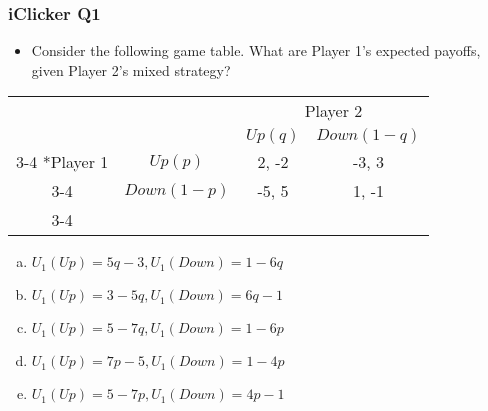 \begin{frame}
\frametitle{iClicker Q1}
\begin{itemize}
\item Consider the following game table. What are Player 1's expected payoffs, given Player 2's mixed strategy?
\end{itemize}
\begin{table}[h]
\centering
\begin{tabular}{cc|c|c|}
	& \multicolumn{1}{c}{} & \multicolumn{2}{c}{Player 2}\\
	& \multicolumn{1}{c}{} & \multicolumn{1}{c}{$Up (q)$}  & \multicolumn{1}{c}{$Down (1 - q)$} \\\cline{3-4}
	\multirow{2}*{Player 1}  & $Up (p)$ & 2, -2 & -3, 3 \\\cline{3-4}
	& $Down (1 - p)$ & -5, 5 & 1, -1 \\\cline{3-4}
\end{tabular}
\end{table}
  \begin{enumerate}[(a)]
\item $U_1(Up) = 5q - 3, U_1(Down) = 1 - 6q$
\item $U_1(Up) = 3 - 5q, U_1(Down) = 6q - 1$
\item $U_1(Up) = 5 - 7q, U_1(Down) = 1 - 6p$
\item $U_1(Up) = 7p - 5, U_1(Down) = 1 - 4p$
\item $U_1(Up) = 5 - 7p, U_1(Down) = 4p - 1$
\end{enumerate}
\end{frame}


